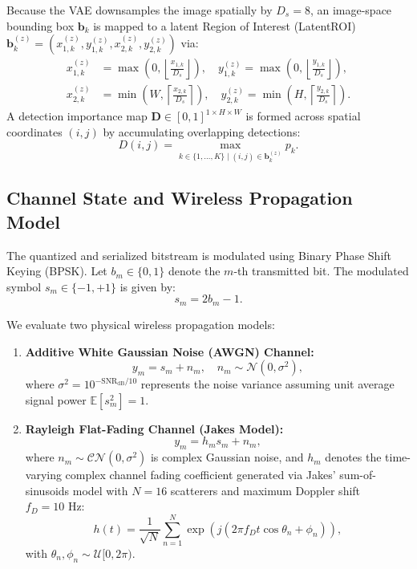 \documentclass[journal,twocolumn]{IEEEtran}
\begin{document}
Because the VAE downsamples the image spatially by $D_s = 8$, an image-space bounding box $\mathbf{b}_k$ is mapped to a latent Region of Interest (LatentROI) $\mathbf{b}_k^{(z)} = (x_{1,k}^{(z)}, y_{1,k}^{(z)}, x_{2,k}^{(z)}, y_{2,k}^{(z)})$ via:
\begin{align}
x_{1,k}^{(z)} &= \max\left(0, \left\lfloor \frac{x_{1,k}}{D_s} \right\rfloor\right), \quad y_{1,k}^{(z)} = \max\left(0, \left\lfloor \frac{y_{1,k}}{D_s} \right\rfloor\right), \label{eq:latent_roi_1} \\
x_{2,k}^{(z)} &= \min\left(W, \left\lceil \frac{x_{2,k}}{D_s} \right\rceil\right), \quad y_{2,k}^{(z)} = \min\left(H, \left\lceil \frac{y_{2,k}}{D_s} \right\rceil\right). \label{eq:latent_roi_2}
\end{align}
A detection importance map $\mathbf{D} \in [0, 1]^{1 \times H \times W}$ is formed across spatial coordinates $(i,j)$ by accumulating overlapping detections:
\begin{equation}
D(i,j) = \max_{k \in \{1,\dots,K\} \mid (i,j) \in \mathbf{b}_k^{(z)}} p_k.
\label{eq:det_importance_map}
\end{equation}

\subsection{Channel State and Wireless Propagation Model}
The quantized and serialized bitstream is modulated using Binary Phase Shift Keying (BPSK). Let $b_m \in \{0, 1\}$ denote the $m$-th transmitted bit. The modulated symbol $s_m \in \{-1, +1\}$ is given by:
\begin{equation}
s_m = 2b_m - 1.
\label{eq:bpsk_mod}
\end{equation}

We evaluate two physical wireless propagation models:
\begin{enumerate}
    \item \textbf{Additive White Gaussian Noise (AWGN) Channel:}
    \begin{equation}
    y_m = s_m + n_m, \quad n_m \sim \mathcal{N}(0, \sigma^2),
    \label{eq:awgn_model}
    \end{equation}
    where $\sigma^2 = 10^{-\text{SNR}_{\text{dB}} / 10}$ represents the noise variance assuming unit average signal power $\mathbb{E}[s_m^2] = 1$.
    \item \textbf{Rayleigh Flat-Fading Channel (Jakes Model):}
    \begin{equation}
    y_m = h_m s_m + n_m,
    \label{eq:rayleigh_model}
    \end{equation}
    where $n_m \sim \mathcal{CN}(0, \sigma^2)$ is complex Gaussian noise, and $h_m$ denotes the time-varying complex channel fading coefficient generated via Jakes' sum-of-sinusoids model with $N=16$ scatterers and maximum Doppler shift $f_D = 10\text{ Hz}$:
    \begin{equation}
    h(t) = \frac{1}{\sqrt{N}} \sum_{n=1}^N \exp\left(j\left(2\pi f_D t \cos\theta_n + \phi_n\right)\right),
    \label{eq:jakes_model}
    \end{equation}
    with $\theta_n, \phi_n \sim \mathcal{U}[0, 2\pi)$.
\end{enumerate}
\end{document}
